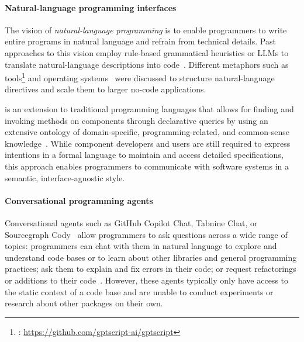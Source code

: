 \paragraph{Natural-language programming interfaces}
\label{sec:related_work/nlp}

The vision of \emph{natural-language programming} is to enable programmers to write entire programs in natural language and refrain from technical details.
Past approaches to this vision employ rule-based grammatical heuristics or LLMs to translate natural-language descriptions into code~\cite{mihalcea2006nlp}.
Different metaphors such as tools\footnote{: \url{https://github.com/gptscript-ai/gptscript}} and operating systems~\cite{mei2024aios} were discussed to structure natural-language directives and scale them to larger no-code applications.

 is an extension to traditional programming languages that allows for finding and invoking methods on components through declarative queries by using an extensive ontology of domain-specific, programming-related, and common-sense knowledge~\cite{samimi2014call}.
While component developers and users are still required to express intentions in a formal language to maintain and access detailed specifications, this approach enables programmers to communicate with software systems in a semantic, interface-agnostic style.

\paragraph{Conversational programming agents}
\label{par:related_work/interfaces/agents}

Conversational agents such as GitHub Copilot Chat, Tabnine Chat, or Sourcegraph Cody~\cite{hartman2024ai} allow programmers to ask questions across a wide range of topics:
programmers can chat with them in natural language to explore and understand code bases or to learn about other libraries and general programming practices; ask them to explain and fix errors in their code; or request refactorings or additions to their code~\cite{peter2022designing,kuramitsu2023kogi,stevens2023programmers}.
However, these agents typically only have access to the static context of a code base and are unable to conduct experiments or research about other packages on their own.
